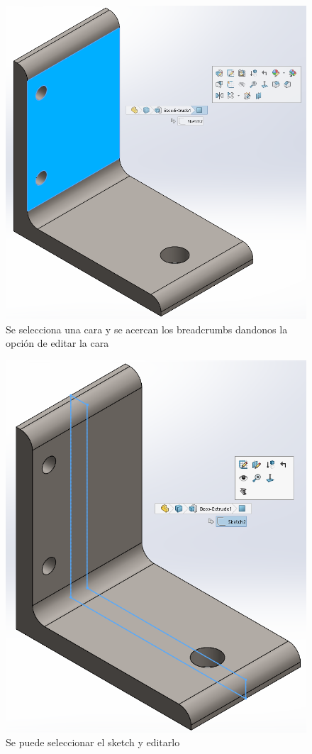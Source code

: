 \documentclass[12pt,letterpaper,final]{report}
\begin{document}
\begin{figure}[H]
	\centering
	\includegraphics[width=0.75\linewidth, height=0.65\textheight,keepaspectratio]{Imagenes/solidworks_breadcrumbs_01}
	\caption{Se selecciona una cara y se acercan los breadcrumbs dandonos la opción de editar la cara}
	\label{fig:solidworksbreadcrumbs01}
\end{figure}

\begin{figure}[H]
	\centering
	\includegraphics[width=0.75\linewidth, height=0.45\textheight,keepaspectratio]{Imagenes/solidworks_breadcrumbs_02}
	\caption{Se puede seleccionar el sketch y editarlo}
	\label{fig:solidworksbreadcrumbs02}
\end{figure}
\end{document}
